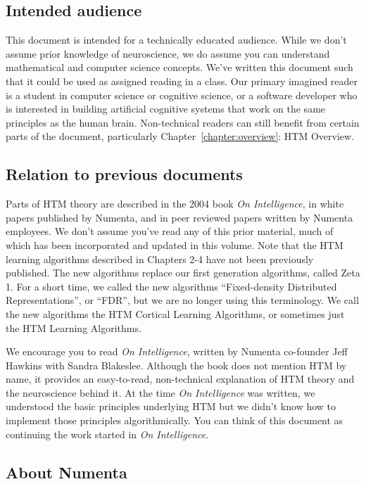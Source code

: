 \documentclass{report}
\begin{document}
\subsection*{Intended audience}

This document is intended for a technically educated audience. While
we don't assume prior knowledge of neuroscience, we do assume you can
understand mathematical and computer science concepts. We've written
this document such that it could be used as assigned reading in a
class. Our primary imagined reader is a student in computer science or
cognitive science, or a software developer who is interested in
building artificial cognitive systems that work on the same principles
as the human brain.  Non-technical readers can still benefit from
certain parts of the document, particularly
Chapter~\ref{chapter:overview}: HTM Overview.

\subsection*{Relation to previous documents}

Parts of HTM theory are described in the 2004 book {\em On
  Intelligence}, in white papers published by Numenta, and in peer
reviewed papers written by Numenta employees. We don't assume you've
read any of this prior material, much of which has been incorporated
and updated in this volume. Note that the HTM learning algorithms
described in Chapters 2-4 have not been previously published. The new
algorithms replace our first generation algorithms, called Zeta 1. For
a short time, we called the new algorithms ``Fixed-density Distributed
Representations'', or ``FDR'', but we are no longer using this
terminology. We call the new algorithms the HTM Cortical Learning
Algorithms, or sometimes just the HTM Learning Algorithms.

We encourage you to read {\em On Intelligence}, written by Numenta
co-founder Jeff Hawkins with Sandra Blakeslee. Although the book does
not mention HTM by name, it provides an easy-to-read, non-technical
explanation of HTM theory and the neuroscience behind it. At the time
{\em On Intelligence} was written, we understood the basic
principles underlying HTM but we didn't know how to implement those
principles algorithmically. You can think of this document as
continuing the work started in {\em On Intelligence}.

\subsection*{About Numenta}
\end{document}
